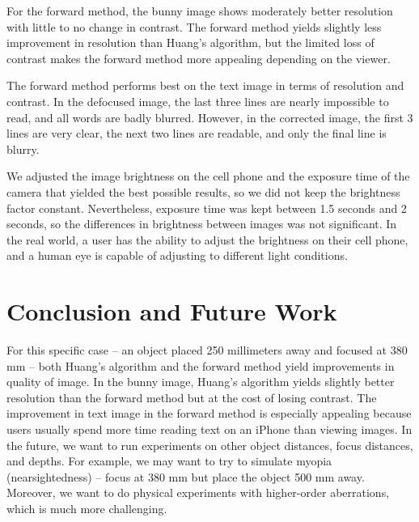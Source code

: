 For the forward method, the bunny image shows moderately better resolution with little to no change in contrast. The forward method yields slightly less improvement in resolution than Huang’s algorithm, but the limited loss of contrast makes the forward method more appealing depending on the viewer.

The forward method performs best on the text image in terms of resolution and contrast. In the defocused image, the last three lines are nearly impossible to read, and all words are badly blurred. However, in the corrected image, the first 3 lines are very clear, the next two lines are readable, and only the final line is blurry. 

We adjusted the image brightness on the cell phone and the exposure time of the camera that yielded the best possible results, so we did not keep the brightness factor constant. Nevertheless, exposure time was kept between 1.5 seconds and 2 seconds, so the differences in brightness between images was not significant. In the real world, a user has the ability to adjust the brightness on their cell phone, and a human eye is capable of adjusting to different light conditions. 

\section{Conclusion and Future Work}
For this specific case – an object placed 250 millimeters away and focused at 380 mm – both Huang’s algorithm and the forward method yield improvements in quality of image. In the bunny image, Huang’s algorithm yields slightly better resolution than the forward method but at the cost of losing contrast. The improvement in text image in the forward method is especially appealing because users usually spend more time reading text on an iPhone than viewing images. 
In the future, we want to run experiments on other object distances, focus distances, and depths. For example, we may want to try to simulate myopia (nearsightedness) – focus at 380 mm but place the object 500 mm away. Moreover, we want to do physical experiments with higher-order aberrations, which is much more challenging.

